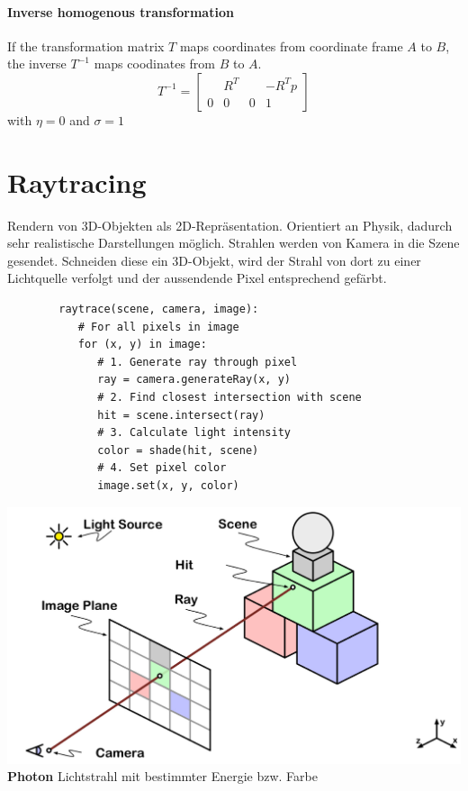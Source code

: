 \documentclass[12pt]{article}
\begin{document}
	\paragraph{Inverse homogenous transformation} If the transformation matrix $T$ maps coordinates from coordinate frame $A$ to $B$, the inverse $T^{-1}$ maps coodinates from $B$ to $A$.
	\begin{equation}
	T^{-1} = 
	\begin{bmatrix}
	& R^T & & -R^T p\\
	0 & 0 & 0 & 1
	\end{bmatrix}
	\end{equation}
	with $\eta = 0$ and $\sigma = 1$
	
	\section{Raytracing}
	Rendern von 3D-Objekten als 2D-Repräsentation. Orientiert an Physik, dadurch sehr realistische Darstellungen möglich. Strahlen werden von Kamera in die Szene gesendet. Schneiden diese ein 3D-Objekt, wird der Strahl von dort zu einer Lichtquelle verfolgt und der aussendende Pixel entsprechend gefärbt.\\
	\begin{verbatim}
		raytrace(scene, camera, image):
		   # For all pixels in image
		   for (x, y) in image:
		      # 1. Generate ray through pixel
		      ray = camera.generateRay(x, y)
		      # 2. Find closest intersection with scene
		      hit = scene.intersect(ray)
		      # 3. Calculate light intensity
		      color = shade(hit, scene)
		      # 4. Set pixel color
		      image.set(x, y, color)		
	\end{verbatim}
	\includegraphics[width=\linewidth]{figures/raytracing.png}\\
	\textbf{Photon} Lichtstrahl mit bestimmter Energie bzw. Farbe
\end{document}
